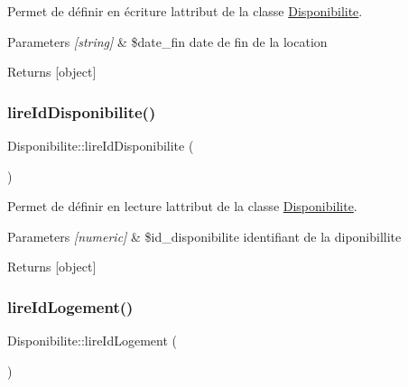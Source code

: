Permet de définir en écriture l\textquotesingle{}attribut de la classe \hyperlink{class_disponibilite}{Disponibilite}. 


\begin{DoxyParams}{Parameters}
{\em \mbox{[}string\mbox{]}} & \$date\+\_\+fin date de fin de la location \\
\hline
\end{DoxyParams}
\begin{DoxyReturn}{Returns}
\mbox{[}object\mbox{]} 
\end{DoxyReturn}
\mbox{\label{class_disponibilite_a31e4f245de8b4fac3ac59c20b9fb5a32}} 
\subsubsection{\texorpdfstring{lire\+Id\+Disponibilite()}{lireIdDisponibilite()}}
{\footnotesize\ttfamily Disponibilite\+::lire\+Id\+Disponibilite (\begin{DoxyParamCaption}{ }\end{DoxyParamCaption})}



Permet de définir en lecture l\textquotesingle{}attribut de la classe \hyperlink{class_disponibilite}{Disponibilite}. 


\begin{DoxyParams}{Parameters}
{\em \mbox{[}numeric\mbox{]}} & \$id\+\_\+disponibilite identifiant de la diponibillite \\
\hline
\end{DoxyParams}
\begin{DoxyReturn}{Returns}
\mbox{[}object\mbox{]} 
\end{DoxyReturn}
\mbox{\label{class_disponibilite_a88de95c77a8d7002512de69fb198ce14}} 
\subsubsection{\texorpdfstring{lire\+Id\+Logement()}{lireIdLogement()}}
{\footnotesize\ttfamily Disponibilite\+::lire\+Id\+Logement (\begin{DoxyParamCaption}{ }\end{DoxyParamCaption})}



